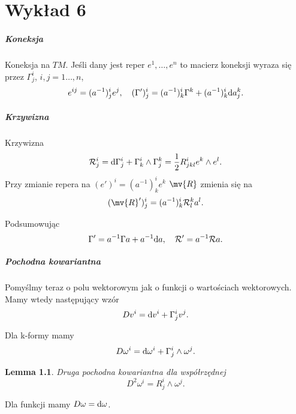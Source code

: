 \documentclass[11pt]{book}
\theoremstyle{definition} %
\theoremstyle{plain} %
\newtheorem{lemma}[theorem]{Lemma}
\theoremstyle{remark} %
\theoremstyle{underline}
\begin{document}
  
  \chapter{Wykład 6}
  \paragraph{Koneksja}
  Koneksja na $TM$. 
  Jeśli dany jest reper $e^1, \dots, e^n$ to macierz koneksji wyraza się przez $\Gamma^i_j$, $i, j = 1\dots, n$,
  \begin{displaymath}
    e^{ij} = (a^{-1})^i_j e^j, \quad (\Gamma')^i_j = (a^{-1})^i_k \Gamma^k + (a^{-1})^i_k \mathrm{d} a^k_j.
  \end{displaymath}

  
  \paragraph{Krzywizna}
  Krzywizna
  \begin{displaymath}
    \mathcal{R}^i_j = \mathrm{d} \Gamma^i_j + \Gamma^i_k \wedge \Gamma^k_j = \frac{1}{2} R^i_{jkl} e^k \wedge e^l.
  \end{displaymath}
  Przy zmianie repera na $(e')^i = (a^{-1})^i_k e^k$ $\mv{R}$ zmienia się na
  \begin{displaymath}
    (\mv{R}')^i_j = (a^{-1})^i_k \mc R^k_l a^l.
  \end{displaymath}

  Podsumowując
  \begin{displaymath}
    \Gamma' = a^{-1} \Gamma a + a^{-1} \mathrm{d} a, \quad \mathcal{R}' = a^{-1} \mathcal{R} a.
  \end{displaymath}

  \paragraph{Pochodna kowariantna}
  Pomyślmy teraz o polu wektorowym jak o funkcji o wartościach wektorowych.
  Mamy wtedy następujący wzór
  \begin{displaymath}
    D v^i = \mathrm{d} v^i + \Gamma^i_j v^j.
  \end{displaymath}

  Dla k-formy mamy
  \begin{displaymath}
    D \omega^i = \mathrm{d} \omega^i + \Gamma^i_j \wedge \omega^j.
  \end{displaymath}

  \begin{lemma}
    Druga pochodna kowariantna dla współrzędnej
    \begin{displaymath}
      D^2\omega^i = R^i_j \wedge\omega^j.
    \end{displaymath}
  \end{lemma}
  Dla funkcji mamy $D \omega = \mathrm{d} \omega$.
\end{document}
